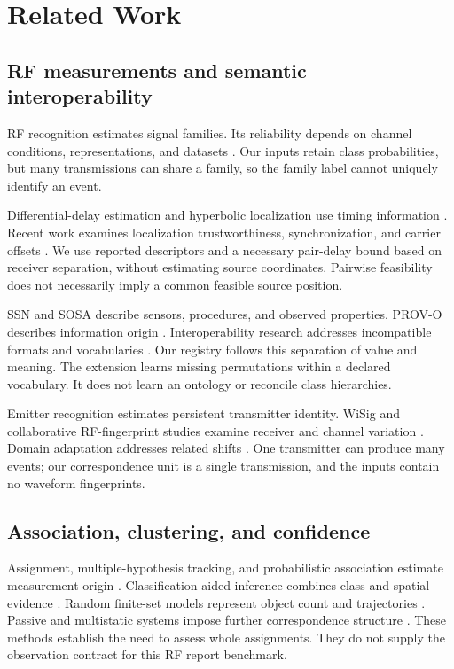 \section{Related Work}
\subsection{RF measurements and semantic interoperability}
RF recognition estimates signal families. Its reliability depends on channel conditions, representations, and datasets \cite{syed2023,zhang2022amc,tian2026,wang2025transfer,xu2024xai}. Our inputs retain class probabilities, but many transmissions can share a family, so the family label cannot uniquely identify an event.

Differential-delay estimation and hyperbolic localization use timing information \cite{knapp,chan}. Recent work examines localization trustworthiness, synchronization, and carrier offsets \cite{pettorru2024,hannotier2024,gur2025}. We use reported descriptors and a necessary pair-delay bound based on receiver separation, without estimating source coordinates. Pairwise feasibility does not necessarily imply a common feasible source position.

SSN and SOSA describe sensors, procedures, and observed properties. PROV-O describes information origin \cite{ssn,sosa,prov}. Interoperability research addresses incompatible formats and vocabularies \cite{qaswar2023,emeterio2026}. Our registry follows this separation of value and meaning. The extension learns missing permutations within a declared vocabulary. It does not learn an ontology or reconcile class hierarchies.

Emitter recognition estimates persistent transmitter identity. WiSig and collaborative RF-fingerprint studies examine receiver and channel variation \cite{wisig,shen2024,sun2024,ahmed2024}. Domain adaptation addresses related shifts \cite{zhang2025,yang2025,feng2025}. One transmitter can produce many events; our correspondence unit is a single transmission, and the inputs contain no waveform fingerprints.

\subsection{Association, clustering, and confidence}
Assignment, multiple-hypothesis tracking, and probabilistic association estimate measurement origin \cite{cengiz2024,kropfreiter2024}. Classification-aided inference combines class and spatial evidence \cite{bai2025}. Random finite-set models represent object count and trajectories \cite{vo2024overview}. Passive and multistatic systems impose further correspondence structure \cite{yan2024,ma2025,sruti2025}. These methods establish the need to assess whole assignments. They do not supply the observation contract for this RF report benchmark.

